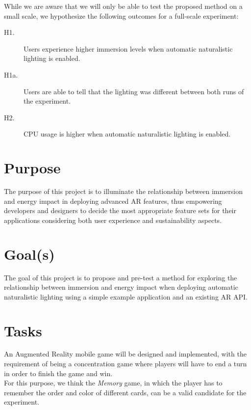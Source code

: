 \documentclass[12pt,twoside,english]{article}
\begin{document}
While we are aware that we will only be able to test the proposed method on a small scale, we hypothesize the following outcomes for a full-scale experiment:

\begin{description}
    \item[H1.] Users experience higher immersion levels when automatic naturalistic lighting is enabled.
    \item[H1a.] Users are able to tell that the lighting was different between both runs of the experiment.
    \item[H2.] \gls{CPU} usage is higher when automatic naturalistic lighting is enabled.
\end{description}



\section{Purpose}
\label{sect:purpose}

The purpose of this project is to illuminate the relationship between immersion and energy impact in deploying advanced \gls{AR} features, thus empowering developers and designers to decide the most appropriate feature sets for their applications considering both user experience and sustainability aspects.

\section{Goal(s)}
\label{sect:goals}

The goal of this project is to propose and pre-test a method for exploring the relationship between immersion and energy impact when deploying automatic naturalistic lighting using a simple example application and an existing \gls{AR} \gls{API}.

\section{Tasks}
\label{sect:tasks}

An Augmented Reality mobile game will be designed and implemented, with the requirement of being a concentration game where players will have to end a turn in order to finish the game and win. \\For this purpose, we think the \textit{Memory} game, in which the player has to remember the order and color of different cards, can be a valid candidate for the experiment.
\end{document}
